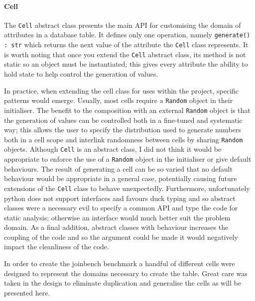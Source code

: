 \paragraph{Cell} The \lstinline{Cell} abstract class presents the main API for
customising the domain of attributes in a database table. It defines only one
operation, namely \lstinline{generate() : str} which returns the next value of
the attribute the \lstinline{Cell} class represents. It is worth noting that
once you extend the \lstinline{Cell} abstract class, its method is not static so
an object must be instantiated; this gives every attribute the ability to hold
state to help control the generation of values.

In practice, when extending the cell class for uses within the project, specific
patterns would emerge. Usually, most cells require a
\lstinline{Random} object in their initialiser. The benefit to the composition
with an external \lstinline{Random} object is that the generation of values can
be controlled both in a fine-tuned and systematic way; this allows the user to
specify the distribution used to generate numbers both in a cell scope and
interlink randomness between cells by sharing \lstinline{Random} objects.
Although \lstinline{Cell} is an abstract class, I did not think it would be
appropriate to enforce the use of a \lstinline{Random} object in the initialiser
or give default behaviours. The result of generating a cell can be so varied
that no default behaviour would be appropriate in a general case, potentially
causing future extensions of the \lstinline{Cell} class to behave unexpectedly.
Furthermore, unfortunately python does not support interfaces and favours duck
typing and so abstract classes were a necessary evil to specify a common API and
type the code for static analysis; otherwise an interface would much better suit
the problem domain. As a final addition, abstract classes with behaviour
increases the coupling of the code and so the argument could be made it would
negatively impact the cleanliness of the code.

In order to create the joinbench benchmark a handful of different cells were
designed to represent the domains necessary to create the 
table. Great care was taken in the design to eliminate duplication and
generalise the cells as will be presented here.

